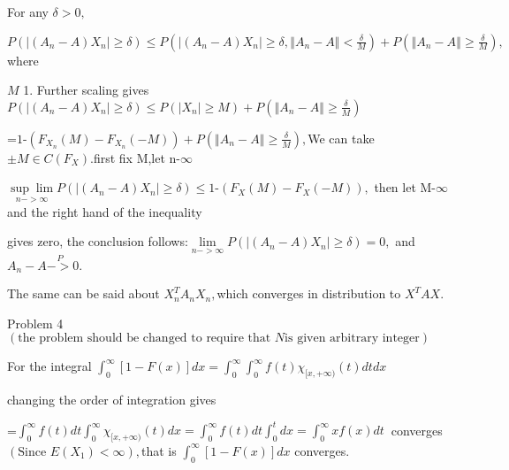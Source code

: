 \documentclass{article}
\begin{document}
\bigskip For any $\delta >0,$

$P\left( \left\vert \left( A_{n}-A\right) X_{n}\right\vert \geq \delta
\right) \leq P\left( \left\vert \left( A_{n}-A\right) X_{n}\right\vert \geq
\delta ,\left\Vert A_{n}-A\right\Vert <\frac{\delta }{M}\right) +P\left(
\left\Vert A_{n}-A\right\Vert \geq \frac{\delta }{M}\right) ,$where

$M$ \TEXTsymbol{>}\TEXTsymbol{>}1. Further scaling gives $P\left( \left\vert
\left( A_{n}-A\right) X_{n}\right\vert \geq \delta \right) \leq P\left(
\left\vert X_{n}\right\vert \geq M\right) +P\left( \left\Vert
A_{n}-A\right\Vert \geq \frac{\delta }{M}\right) $

=$1$-$\left( F_{X_{n}}\left( M\right) -F_{X_{n}}\left( -M\right) \right)
+P\left( \left\Vert A_{n}-A\right\Vert \geq \frac{\delta }{M}\right) ,$We
can take $\pm M\in C\left( F_{X}\right) .$first fix M,let n-\TEXTsymbol{>}$%
\infty $

$\underset{n->\infty }{\sup \lim }P\left( \left\vert \left( A_{n}-A\right)
X_{n}\right\vert \geq \delta \right) \leq 1$-$\left( F_{X}\left( M\right)
-F_{X}\left( -M\right) \right) ,$ then let M-\TEXTsymbol{>}$\infty $ and the
right hand of the inequality

gives zero, the conclusion follows:$\underset{n->\infty }{\lim }P\left(
\left\vert \left( A_{n}-A\right) X_{n}\right\vert \geq \delta \right) =0,$
and $A_{n}-A\overset{P}{->}0.$

The same can be said about $X_{n}^{T}A_{n}X_{n},$which converges in
distribution to $X^{T}AX.$

Problem 4$\left( \text{the problem should be changed to require that }N\text{
is given arbitrary integer}\right) $  

For the integral $\int_{0}^{\infty }\left[ 1-F\left( x\right) \right]
dx=\int_{0}^{\infty }\int_{0}^{\infty }f(t)\chi _{\lbrack x,+\infty )}(t)dtdx
$

changing the order of integration gives

=$\int_{0}^{\infty }f(t)dt\int_{0}^{\infty }\chi _{\lbrack x,+\infty
)}(t)dx=\int_{0}^{\infty }f(t)dt\int_{0}^{t}dx=\int_{0}^{\infty }xf(x)dt\ $%
converges$\left( \text{Since }E\left( X_{1}\right) <\infty \right) ,$that is
$\int_{0}^{\infty }\left[ 1-F\left( x\right) \right] dx$ converges.
\end{document}
